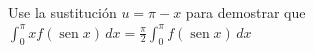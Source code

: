 \item Use la sustitución $u = \pi - x$ para demostrar que $\displaystyle \int_0^\pi x f(\operatorname{sen} x) \, dx = \frac{\pi}{2} \int_0^\pi f(\operatorname{sen} x) \, dx$
